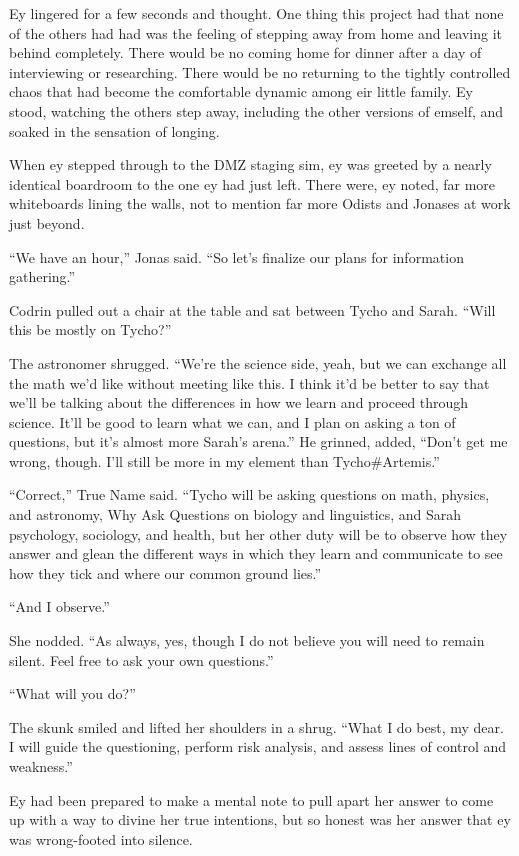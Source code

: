 Ey lingered for a few seconds and thought. One thing this project had that none of the others had had was the feeling of stepping away from home and leaving it behind completely. There would be no coming home for dinner after a day of interviewing or researching. There would be no returning to the tightly controlled chaos that had become the comfortable dynamic among eir little family. Ey stood, watching the others step away, including the other versions of emself, and soaked in the sensation of longing.

When ey stepped through to the DMZ staging sim, ey was greeted by a nearly identical boardroom to the one ey had just left. There were, ey noted, far more whiteboards lining the walls, not to mention far more Odists and Jonases at work just beyond.

``We have an hour,'' Jonas said. ``So let's finalize our plans for information gathering.''

Codrin pulled out a chair at the table and sat between Tycho and Sarah. ``Will this be mostly on Tycho?''

The astronomer shrugged. ``We're the science side, yeah, but we can exchange all the math we'd like without meeting like this. I think it'd be better to say that we'll be talking about the differences in how we learn and proceed through science. It'll be good to learn what we can, and I plan on asking a ton of questions, but it's almost more Sarah's arena.'' He grinned, added, ``Don't get me wrong, though. I'll still be more in my element than Tycho\#Artemis.''

``Correct,'' True Name said. ``Tycho will be asking questions on math, physics, and astronomy, Why Ask Questions on biology and linguistics, and Sarah psychology, sociology, and health, but her other duty will be to observe how they answer and glean the different ways in which they learn and communicate to see how they tick and where our common ground lies.''

``And I observe.''

She nodded. ``As always, yes, though I do not believe you will need to remain silent. Feel free to ask your own questions.''

``What will you do?''

The skunk smiled and lifted her shoulders in a shrug. ``What I do best, my dear. I will guide the questioning, perform risk analysis, and assess lines of control and weakness.''

Ey had been prepared to make a mental note to pull apart her answer to come up with a way to divine her true intentions, but so honest was her answer that ey was wrong-footed into silence.

